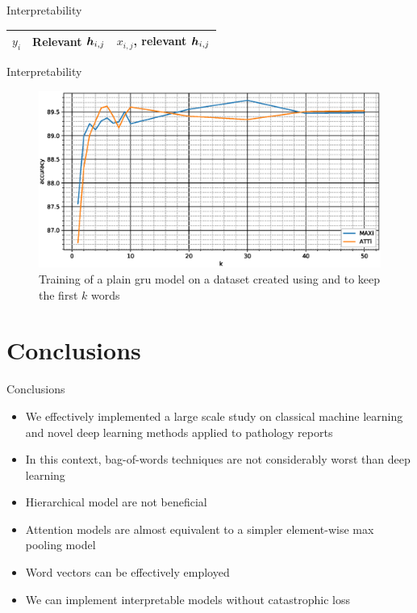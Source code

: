 \begin{frame}{Interpretability}
  \centering
  \tiny
    \begin{tabular}{|c|c|c|}
    \hline
    $y_i$&\textrm{Relevant} $\bm{h}_{i,j}$&$x_{i,j}$\textrm{, relevant} $\bm{h}_{i,j}$\\
    \hline
    
    \hline
    
    \hline
    
    \hline
  \end{tabular}
\end{frame}

\begin{frame}{Interpretability}
  \begin{figure}
  \centering
  \includegraphics[width=\textwidth]{img/plotSintex.eps}
  \caption{Training of a plain \ac{gru} model on a dataset created
    using \maxi{} and \softmaxi{} to keep the first $k$ words}
\end{figure}
\end{frame}

\section{Conclusions}

\begin{frame}{Conclusions}
  \begin{itemize}
  \item We effectively implemented a \alert{large scale} study on classical
    machine learning and novel  deep learning methods
    applied to pathology reports
  \item In this context, \alert{bag-of-words} techniques are not
    considerably worst than \alert{deep learning}
  \item \alert{Hierarchical} model are not beneficial
  \item \alert{Attention} models are almost equivalent to a simpler
    element-wise
    \alert{max} pooling model
  \item \alert{Word vectors} can be effectively employed
  \item We can implement \alert{interpretable} models without
    catastrophic loss
  \end{itemize}
\end{frame}

